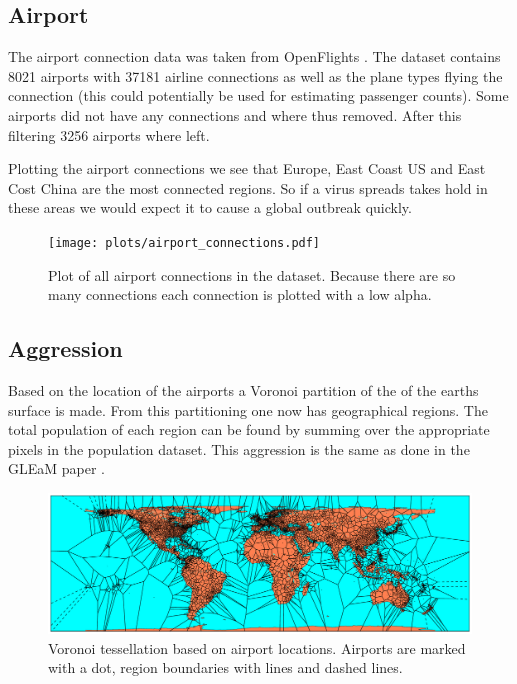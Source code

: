 \subsection{Airport}

The airport connection data was taken from OpenFlights \cite{openflights}. The dataset contains 8021 airports with 37181 airline connections as well as the plane types flying the connection (this could potentially be used for estimating passenger counts). Some airports did not have any connections and where thus removed. After this filtering 3256 airports where left.

Plotting the airport connections we see that Europe, East Coast US and East Cost China are the most connected regions. So if a virus spreads takes hold in these areas we would expect it to cause a global outbreak quickly.

\begin{figure}[H]
	\centering
	\texttt{[image: plots/airport\_connections.pdf]}
	\caption{Plot of all airport connections in the dataset. Because there are so many connections each connection is plotted with a low alpha.}
\end{figure}

\subsection{Aggression}

Based on the location of the airports a Voronoi partition of the of the earths surface is made. From this partitioning one now has geographical regions. The total population of each region can be found by summing over the appropriate pixels in the population dataset. This aggression is the same as done in the GLEaM paper \cite{GLEaM}.

\begin{figure}[H]
	\centering
	\includegraphics[width=1.0 \textwidth]{plots/voronoi.pdf}
	\caption{Voronoi tessellation based on airport locations. Airports are marked with a dot, region boundaries with lines and dashed lines.}
\end{figure}

